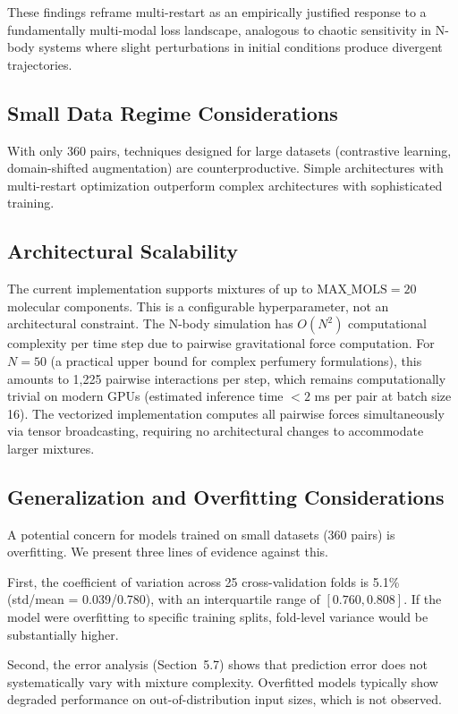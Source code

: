 \documentclass[11pt,a4paper]{article}
\begin{document}
These findings reframe multi-restart as an empirically justified response to a fundamentally multi-modal loss landscape, analogous to chaotic sensitivity in N-body systems where slight perturbations in initial conditions produce divergent trajectories.

\subsection{Small Data Regime Considerations}
With only 360 pairs, techniques designed for large datasets (contrastive learning, domain-shifted augmentation) are counterproductive. Simple architectures with multi-restart optimization outperform complex architectures with sophisticated training.

\subsection{Architectural Scalability}
The current implementation supports mixtures of up to $\text{MAX\_MOLS} = 20$ molecular components. This is a configurable hyperparameter, not an architectural constraint. The N-body simulation has $O(N^2)$ computational complexity per time step due to pairwise gravitational force computation. For $N = 50$ (a practical upper bound for complex perfumery formulations), this amounts to 1,225 pairwise interactions per step, which remains computationally trivial on modern GPUs (estimated inference time $< 2$ ms per pair at batch size 16). The vectorized implementation computes all pairwise forces simultaneously via tensor broadcasting, requiring no architectural changes to accommodate larger mixtures.

\subsection{Generalization and Overfitting Considerations}
A potential concern for models trained on small datasets (360 pairs) is overfitting. We present three lines of evidence against this.

First, the coefficient of variation across 25 cross-validation folds is 5.1\% (std/mean = 0.039/0.780), with an interquartile range of $[0.760, 0.808]$. If the model were overfitting to specific training splits, fold-level variance would be substantially higher.

Second, the error analysis (Section~5.7) shows that prediction error does not systematically vary with mixture complexity. Overfitted models typically show degraded performance on out-of-distribution input sizes, which is not observed.
\end{document}
